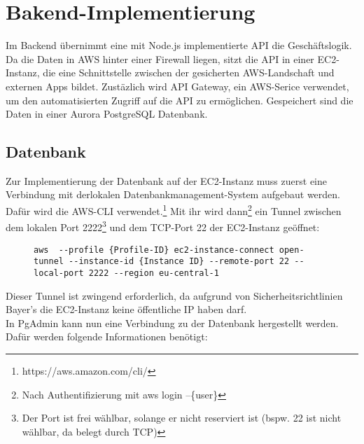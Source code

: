 \section{Bakend-Implementierung}
Im Backend übernimmt eine mit Node.js implementierte API die Geschäftslogik. Da die Daten in AWS hinter einer Firewall liegen,
sitzt die API in einer EC2-Instanz, die eine Schnittstelle zwischen der gesicherten AWS-Landschaft und externen Apps bildet. 
Zustäzlich wird API Gateway, ein AWS-Serice verwendet, um den automatisierten Zugriff auf die API zu ermöglichen. Gespeichert sind 
die Daten in einer Aurora PostgreSQL Datenbank. 
\subsection{Datenbank}
Zur Implementierung der Datenbank auf der EC2-Instanz muss zuerst eine Verbindung mit derlokalen Datenbankmanagement-System aufgebaut werden.
Dafür wird die AWS-CLI verwendet.\footnote{https://aws.amazon.com/cli/} Mit ihr wird dann\footnote{Nach Authentifizierung mit aws login --\{user\}} 
ein Tunnel zwischen dem lokalen Port 2222\footnote{Der Port ist frei wählbar, solange er nicht reserviert ist (bspw. 22 ist nicht wählbar, da belegt durch TCP)} und
dem TCP-Port 22 der EC2-Instanz geöffnet:
\begin{figure}[bht]
    \begin{lstlisting}[caption=SSH-Tunnel mit AWS-CLI, label=list:tunnel]
        aws  --profile {Profile-ID} ec2-instance-connect open-tunnel --instance-id {Instance ID} --remote-port 22 --local-port 2222 --region eu-central-1
    \end{lstlisting}
\end{figure}
Dieser Tunnel ist zwingend erforderlich, da aufgrund von Sicherheitsrichtlinien Bayer's die EC2-Instanz keine öffentliche IP haben darf.\\
In PgAdmin kann nun eine Verbindung zu der Datenbank hergestellt werden. Dafür werden folgende Informationen benötigt:

